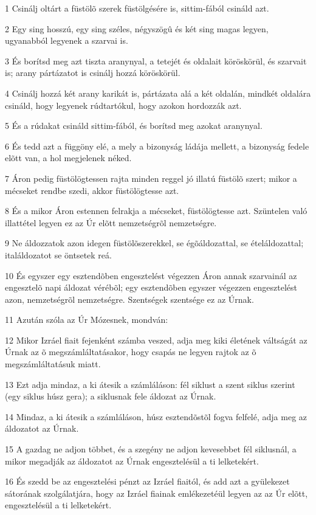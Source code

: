 \par 1 Csinálj oltárt a füstölõ szerek füstölgésére is, sittim-fából csináld azt.
\par 2 Egy sing hosszú, egy sing széles, négyszögû és két sing magas legyen, ugyanabból legyenek a szarvai is.
\par 3 És borítsd meg azt tiszta aranynyal, a tetejét és oldalait köröskörül, és szarvait is; arany pártázatot is csinálj hozzá köröskörül.
\par 4 Csinálj hozzá két arany karikát is, pártázata alá a két oldalán, mindkét oldalára csináld, hogy legyenek rúdtartókul, hogy azokon hordozzák azt.
\par 5 És a rúdakat csináld sittim-fából, és borítsd meg azokat aranynyal.
\par 6 És tedd azt a függöny elé, a mely a bizonyság ládája mellett, a bizonyság fedele elõtt van, a hol megjelenek néked.
\par 7 Áron pedig füstölögtessen rajta minden reggel jó illatú füstölõ szert; mikor a mécseket rendbe szedi, akkor füstölögtesse azt.
\par 8 És a mikor Áron estennen felrakja a mécseket, füstölögtesse azt. Szüntelen való illattétel legyen ez az Úr elõtt nemzetségrõl nemzetségre.
\par 9 Ne áldozzatok azon idegen füstölõszerekkel, se égõáldozattal, se ételáldozattal; italáldozatot se öntsetek reá.
\par 10 És egyszer egy esztendõben engesztelést végezzen Áron annak szarvainál az engesztelõ napi áldozat vérébõl; egy esztendõben egyszer végezzen engesztelést azon, nemzetségrõl nemzetségre. Szentségek szentsége ez az Úrnak.
\par 11 Azután szóla az Úr Mózesnek, mondván:
\par 12 Mikor Izráel fiait fejenként számba veszed, adja meg kiki életének váltságát az Úrnak az õ megszámláltatásakor, hogy csapás ne legyen rajtok az õ megszámláltatásuk miatt.
\par 13 Ezt adja mindaz, a ki átesik a számláláson: fél siklust a szent siklus szerint (egy siklus húsz gera); a siklusnak fele áldozat az Úrnak.
\par 14 Mindaz, a ki átesik a számláláson, húsz esztendõstõl fogva felfelé, adja meg az áldozatot az Úrnak.
\par 15 A gazdag ne adjon többet, és a szegény ne adjon kevesebbet fél siklusnál, a mikor megadják az áldozatot az Úrnak engesztelésül a ti lelketekért.
\par 16 És szedd be az engesztelési pénzt az Izráel fiaitól, és add azt a gyülekezet sátorának szolgálatjára, hogy az Izráel fiainak emlékezetéül legyen az az Úr elõtt, engesztelésül a ti lelketekért.
